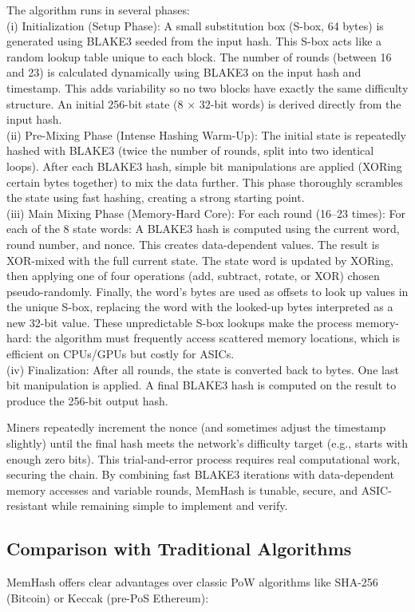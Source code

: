 \documentclass[a4paper,onecolumn,superscriptaddress,10pt]{compositionalityarticle}
\begin{document}
The algorithm runs in several phases: \\ (i) Initialization (Setup Phase): A small substitution box (S-box, 64 bytes) is generated using BLAKE3 seeded from the input hash. This S-box acts like a random lookup table unique to each block. The number of rounds (between 16 and 23) is calculated dynamically using BLAKE3 on the input hash and timestamp. This adds variability so no two blocks have exactly the same difficulty structure. An initial 256-bit state (8 × 32-bit words) is derived directly from the input hash. \\ (ii) Pre-Mixing Phase (Intense Hashing Warm-Up): The initial state is repeatedly hashed with BLAKE3 (twice the number of rounds, split into two identical loops). After each BLAKE3 hash, simple bit manipulations are applied (XORing certain bytes together) to mix the data further. This phase thoroughly scrambles the state using fast hashing, creating a strong starting point.
\\ (iii) Main Mixing Phase (Memory-Hard Core): For each round (16–23 times): For each of the 8 state words: A BLAKE3 hash is computed using the current word, round number, and nonce. This creates data-dependent values. The result is XOR-mixed with the full current state. The state word is updated by XORing, then applying one of four operations (add, subtract, rotate, or XOR) chosen pseudo-randomly. Finally, the word's bytes are used as offsets to look up values in the unique S-box, replacing the word with the looked-up bytes interpreted as a new 32-bit value. These unpredictable S-box lookups make the process memory-hard: the algorithm must frequently access scattered memory locations, which is efficient on CPUs/GPUs but costly for ASICs. \\ (iv) Finalization: After all rounds, the state is converted back to bytes. One last bit manipulation is applied. A final BLAKE3 hash is computed on the result to produce the 256-bit output hash.

Miners repeatedly increment the nonce (and sometimes adjust the timestamp slightly) until the final hash meets the network's difficulty target (e.g., starts with enough zero bits). This trial-and-error process requires real computational work, securing the chain. By combining fast BLAKE3 iterations with data-dependent memory accesses and variable rounds, MemHash is tunable, secure, and ASIC-resistant while remaining simple to implement and verify.

\subsection{Comparison with Traditional Algorithms}
MemHash offers clear advantages over classic PoW algorithms like SHA-256 (Bitcoin) or Keccak (pre-PoS Ethereum):
\end{document}
